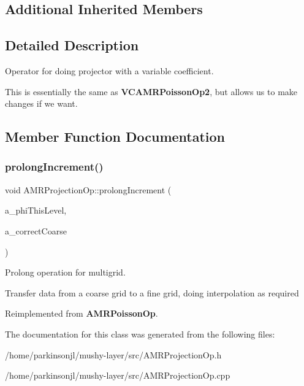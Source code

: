 \subsection*{Additional Inherited Members}


\subsection{Detailed Description}
Operator for doing projector with a variable coefficient. 

This is essentially the same as \textbf{ V\+C\+A\+M\+R\+Poisson\+Op2}, but allows us to make changes if we want. 

\subsection{Member Function Documentation}
\mbox{\label{class_a_m_r_projection_op_a9a015d1c2ac019517518e88aefecb6fa}} 
\subsubsection{\texorpdfstring{prolong\+Increment()}{prolongIncrement()}}
{\footnotesize\ttfamily void A\+M\+R\+Projection\+Op\+::prolong\+Increment (\begin{DoxyParamCaption}\item[{\textbf{ Level\+Data}$<$ \textbf{ F\+Array\+Box} $>$ \&}]{a\+\_\+phi\+This\+Level,  }\item[{const \textbf{ Level\+Data}$<$ \textbf{ F\+Array\+Box} $>$ \&}]{a\+\_\+correct\+Coarse }\end{DoxyParamCaption})\hspace{0.3cm}{\ttfamily [virtual]}}



Prolong operation for multigrid. 

Transfer data from a coarse grid to a fine grid, doing interpolation as required 

Reimplemented from \textbf{ A\+M\+R\+Poisson\+Op}.



The documentation for this class was generated from the following files\+:\begin{DoxyCompactItemize}
\item 
/home/parkinsonjl/mushy-\/layer/src/A\+M\+R\+Projection\+Op.\+h\item 
/home/parkinsonjl/mushy-\/layer/src/A\+M\+R\+Projection\+Op.\+cpp\end{DoxyCompactItemize}
